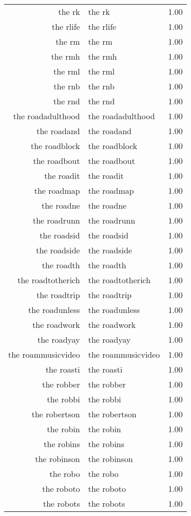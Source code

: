 \begin{table}[ht]
\begin{tabular}{rlr}
  the rk & the rk & 1.00 \\ 
  the rlife & the rlife & 1.00 \\ 
  the rm & the rm & 1.00 \\ 
  the rmh & the rmh & 1.00 \\ 
  the rml & the rml & 1.00 \\ 
  the rnb & the rnb & 1.00 \\ 
  the rnd & the rnd & 1.00 \\ 
  the roadadulthood & the roadadulthood & 1.00 \\ 
  the roadand & the roadand & 1.00 \\ 
  the roadblock & the roadblock & 1.00 \\ 
  the roadbout & the roadbout & 1.00 \\ 
  the roadit & the roadit & 1.00 \\ 
  the roadmap & the roadmap & 1.00 \\ 
  the roadne & the roadne & 1.00 \\ 
  the roadrunn & the roadrunn & 1.00 \\ 
  the roadsid & the roadsid & 1.00 \\ 
  the roadside & the roadside & 1.00 \\ 
  the roadth & the roadth & 1.00 \\ 
  the roadtotherich & the roadtotherich & 1.00 \\ 
  the roadtrip & the roadtrip & 1.00 \\ 
  the roadunless & the roadunless & 1.00 \\ 
  the roadwork & the roadwork & 1.00 \\ 
  the roadyay & the roadyay & 1.00 \\ 
  the roammusicvideo & the roammusicvideo & 1.00 \\ 
  the roasti & the roasti & 1.00 \\ 
  the robber & the robber & 1.00 \\ 
  the robbi & the robbi & 1.00 \\ 
  the robertson & the robertson & 1.00 \\ 
  the robin & the robin & 1.00 \\ 
  the robins & the robins & 1.00 \\ 
  the robinson & the robinson & 1.00 \\ 
  the robo & the robo & 1.00 \\ 
  the roboto & the roboto & 1.00 \\ 
  the robots & the robots & 1.00 \\ 

\end{tabular}
\end{table}
